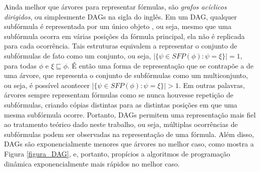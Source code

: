 Ainda melhor que árvores para representar fórmulas, são \emph{grafos acíclicos dirigidos}, ou simplesmente DAGs na sigla do inglês. Em um DAG, qualquer subfórmula é representada por um único objeto \cite{jackson2004clause}, ou seja, mesmo que uma subfórmula ocorra em várias posições da fórmula principal, ela não é replicada para cada ocorrência. Tais estruturas equivalem a representar o conjunto de subfórmulas de fato como um conjunto, ou seja, $|\{\psi \in SFP(\phi) : \psi = \xi \}| = 1$, para todas $\phi$ e $\xi \sqsubseteq \phi$. É então uma forma de representação que se contrapõe a de uma árvore, que representa o conjunto de subfórmulas como um multiconjunto, ou seja, é possível acontecer $|\{\psi \in SFP(\phi) : \psi = \xi \}| > 1$. Em outras palavras, árvores sempre representam fórmulas como se nunca houvesse repetição de subfórmulas, criando cópias distintas para as distintas posições em que uma mesma subfórmula ocorre. Portanto, DAGs permitem uma representação mais fiel ao tratamento teórico dado neste trabalho, ou seja, múltiplas ocorrências de subfórmulas podem ser observadas na representação de uma fórmula. Além disso, DAGs são exponencialmente menores que árvores no melhor caso, como mostra a Figura \ref{figura_DAG}, e, portanto, propícios a algoritmos de programação dinâmica \cite{bellman2015applied} exponencialmente mais rápidos no melhor caso.


